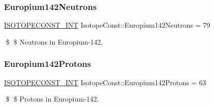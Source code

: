 \subsubsection{\texorpdfstring{Europium142\+Neutrons}{Europium142Neutrons}}
{\footnotesize\ttfamily \mbox{\hyperlink{group___isotope_const-_macros_ga5f18360b3e99483a35c32d789e62621c}{I\+S\+O\+T\+O\+P\+E\+C\+O\+N\+S\+T\+\_\+\+I\+NT}} Isotope\+Const\+::\+Europium142\+Neutrons = 79}

\$ \$ Neutrons in Europium-\/142. \mbox{\label{group___isotope_const-_europium-_eu142_ga305a0d1ac1489b83c707d825094afccd}} 
\subsubsection{\texorpdfstring{Europium142\+Protons}{Europium142Protons}}
{\footnotesize\ttfamily \mbox{\hyperlink{group___isotope_const-_macros_ga5f18360b3e99483a35c32d789e62621c}{I\+S\+O\+T\+O\+P\+E\+C\+O\+N\+S\+T\+\_\+\+I\+NT}} Isotope\+Const\+::\+Europium142\+Protons = 63}

\$ \$ Protons in Europium-\/142. 